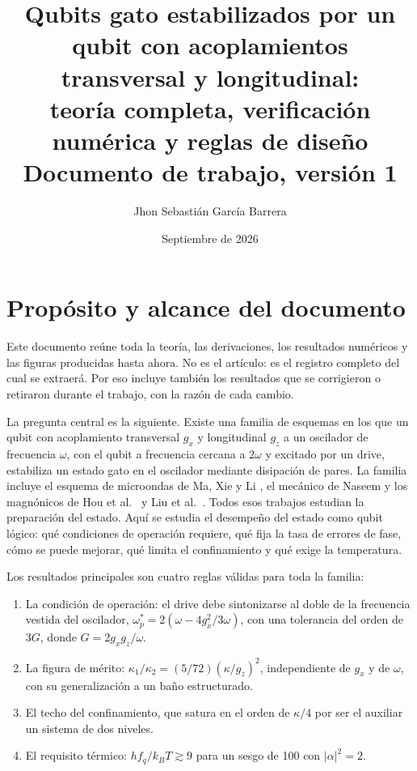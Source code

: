\documentclass[11pt]{report}
\title{Qubits gato estabilizados por un qubit con acoplamientos transversal y longitudinal:\\ teor\'ia completa, verificaci\'on num\'erica y reglas de dise\~no\\[1ex] \large Documento de trabajo, versi\'on 1}
\author{Jhon Sebasti\'an Garc\'ia Barrera}
\date{Septiembre de 2026}
\begin{document}
\maketitle
\tableofcontents

\section{Prop\'osito y alcance del documento}

Este documento re\'une toda la teor\'ia, las derivaciones, los resultados num\'ericos y las figuras producidas hasta ahora. No es el art\'iculo: es el registro completo del cual se extraer\'a. Por eso incluye tambi\'en los resultados que se corrigieron o retiraron durante el trabajo, con la raz\'on de cada cambio.

La pregunta central es la siguiente. Existe una familia de esquemas en los que un qubit con acoplamiento transversal $g_{x}$ y longitudinal $g_{z}$ a un oscilador de frecuencia $\omega$, con el qubit a frecuencia cercana a $2\omega$ y excitado por un drive, estabiliza un estado gato en el oscilador mediante disipaci\'on de pares. La familia incluye el esquema de microondas de Ma, Xie y Li \cite{Ma2019}, el mec\'anico de Naseem \cite{Naseem2026} y los magn\'onicos de Hou et al.\ \cite{Hou2024} y Liu et al.\ \cite{Liu2025}. Todos esos trabajos estudian la preparaci\'on del estado. Aqu\'i se estudia el desempe\~no del estado como qubit l\'ogico: qu\'e condiciones de operaci\'on requiere, qu\'e fija la tasa de errores de fase, c\'omo se puede mejorar, qu\'e limita el confinamiento y qu\'e exige la temperatura.

Los resultados principales son cuatro reglas v\'alidas para toda la familia:
\begin{enumerate}
\item La condici\'on de operaci\'on: el drive debe sintonizarse al doble de la frecuencia vestida del oscilador, $\omega_{p}^{*}=2(\omega-4g_{x}^{2}/3\omega)$, con una tolerancia del orden de $3G$, donde $G=2g_{x}g_{z}/\omega$.
\item La figura de m\'erito: $\kappa_{1}/\kappa_{2}=(5/72)(\kappa/g_{z})^{2}$, independiente de $g_{x}$ y de $\omega$, con su generalizaci\'on a un baño estructurado.
\item El techo del confinamiento, que satura en el orden de $\kappa/4$ por ser el auxiliar un sistema de dos niveles.
\item El requisito t\'ermico: $hf_{q}/k_{B}T\gtrsim9$ para un sesgo de 100 con $|\alpha|^{2}=2$.
\end{enumerate}
\end{document}
